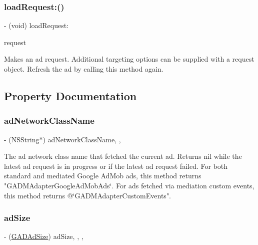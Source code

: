 \subsubsection{\texorpdfstring{load\+Request\+:()}{loadRequest:()}}
{\footnotesize\ttfamily -\/ (void) load\+Request\+: \begin{DoxyParamCaption}\item[{(\hyperlink{interfaceGADRequest}{G\+A\+D\+Request} $\ast$)}]{request }\end{DoxyParamCaption}}

Makes an ad request. Additional targeting options can be supplied with a request object. Refresh the ad by calling this method again. 

\subsection{Property Documentation}
\mbox{\label{interfaceGADBannerView_ac3832b1fd7640885f26c780cd1f8c977}} 
\subsubsection{\texorpdfstring{ad\+Network\+Class\+Name}{adNetworkClassName}}
{\footnotesize\ttfamily -\/ (N\+S\+String$\ast$) ad\+Network\+Class\+Name\hspace{0.3cm}{\ttfamily [read]}, {\ttfamily [nonatomic]}, {\ttfamily [weak]}}

The ad network class name that fetched the current ad. Returns nil while the latest ad request is in progress or if the latest ad request failed. For both standard and mediated Google Ad\+Mob ads, this method returns "G\+A\+D\+M\+Adapter\+Google\+Ad\+Mob\+Ads\char`\"{}. For ads fetched via mediation custom
events, this method returns @\char`\"{}G\+A\+D\+M\+Adapter\+Custom\+Events". \mbox{\label{interfaceGADBannerView_afb0c778e6fa6584f63b7c1d06a4f96fa}} 
\subsubsection{\texorpdfstring{ad\+Size}{adSize}}
{\footnotesize\ttfamily -\/ (\hyperlink{structGADAdSize}{G\+A\+D\+Ad\+Size}) ad\+Size\hspace{0.3cm}{\ttfamily [read]}, {\ttfamily [write]}, {\ttfamily [nonatomic]}, {\ttfamily [assign]}}

